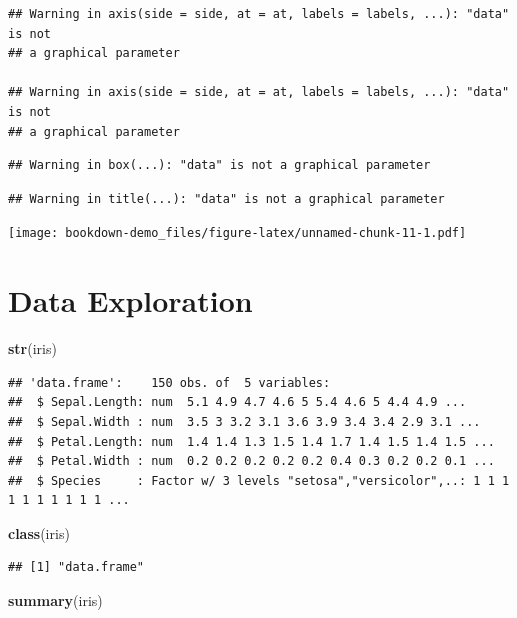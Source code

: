 \documentclass[]{book}
\newenvironment{Shaded}{\begin{snugshade}}{\end{snugshade}}
\newcommand{\KeywordTok}[1]{\textcolor[rgb]{0.13,0.29,0.53}{\textbf{#1}}}
\newcommand{\NormalTok}[1]{#1}
\theoremstyle{definition}
\theoremstyle{definition}
\theoremstyle{definition}
\theoremstyle{remark}
\begin{document}
\begin{verbatim}
## Warning in axis(side = side, at = at, labels = labels, ...): "data" is not
## a graphical parameter

## Warning in axis(side = side, at = at, labels = labels, ...): "data" is not
## a graphical parameter
\end{verbatim}

\begin{verbatim}
## Warning in box(...): "data" is not a graphical parameter
\end{verbatim}

\begin{verbatim}
## Warning in title(...): "data" is not a graphical parameter
\end{verbatim}

\texttt{[image: bookdown-demo\_files/figure-latex/unnamed-chunk-11-1.pdf]}

\section{Data Exploration}\label{data-exploration}

\begin{Shaded}
\begin{Highlighting}[]
\KeywordTok{str}\NormalTok{(iris)}
\end{Highlighting}
\end{Shaded}

\begin{verbatim}
## 'data.frame':    150 obs. of  5 variables:
##  $ Sepal.Length: num  5.1 4.9 4.7 4.6 5 5.4 4.6 5 4.4 4.9 ...
##  $ Sepal.Width : num  3.5 3 3.2 3.1 3.6 3.9 3.4 3.4 2.9 3.1 ...
##  $ Petal.Length: num  1.4 1.4 1.3 1.5 1.4 1.7 1.4 1.5 1.4 1.5 ...
##  $ Petal.Width : num  0.2 0.2 0.2 0.2 0.2 0.4 0.3 0.2 0.2 0.1 ...
##  $ Species     : Factor w/ 3 levels "setosa","versicolor",..: 1 1 1 1 1 1 1 1 1 1 ...
\end{verbatim}

\begin{Shaded}
\begin{Highlighting}[]
\KeywordTok{class}\NormalTok{(iris)}
\end{Highlighting}
\end{Shaded}

\begin{verbatim}
## [1] "data.frame"
\end{verbatim}

\begin{Shaded}
\begin{Highlighting}[]
\KeywordTok{summary}\NormalTok{(iris)}
\end{Highlighting}
\end{Shaded}
\end{document}
